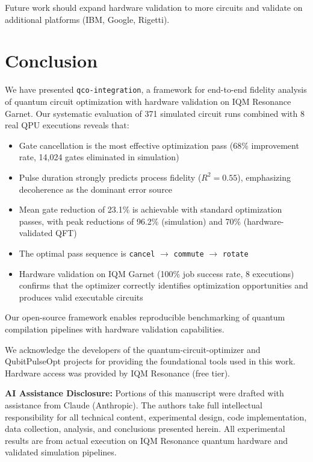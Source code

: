 \documentclass[twocolumn,showpacs,preprintnumbers,amsmath,amssymb,prb]{revtex4-2}
\begin{document}
Future work should expand hardware validation to more circuits and validate on additional platforms (IBM, Google, Rigetti).

\section{Conclusion}
\label{sec:conclusion}

We have presented \texttt{qco-integration}, a framework for end-to-end fidelity analysis of quantum circuit optimization with hardware validation on IQM Resonance Garnet. Our systematic evaluation of 371 simulated circuit runs combined with 8 real QPU executions reveals that:

\begin{itemize}
    \item Gate cancellation is the most effective optimization pass (68\% improvement rate, 14,024 gates eliminated in simulation)
    \item Pulse duration strongly predicts process fidelity ($R^2 = 0.55$), emphasizing decoherence as the dominant error source
    \item Mean gate reduction of 23.1\% is achievable with standard optimization passes, with peak reductions of 96.2\% (simulation) and 70\% (hardware-validated QFT)
    \item The optimal pass sequence is \texttt{cancel} $\rightarrow$ \texttt{commute} $\rightarrow$ \texttt{rotate}
    \item Hardware validation on IQM Garnet (100\% job success rate, 8 executions) confirms that the optimizer correctly identifies optimization opportunities and produces valid executable circuits
\end{itemize}

Our open-source framework enables reproducible benchmarking of quantum compilation pipelines with hardware validation capabilities.

\begin{acknowledgments}
We acknowledge the developers of the quantum-circuit-optimizer and QubitPulseOpt projects for providing the foundational tools used in this work. Hardware access was provided by IQM Resonance (free tier).

\textbf{AI Assistance Disclosure:} Portions of this manuscript were drafted with assistance from Claude (Anthropic). The authors take full intellectual responsibility for all technical content, experimental design, code implementation, data collection, analysis, and conclusions presented herein. All experimental results are from actual execution on IQM Resonance quantum hardware and validated simulation pipelines.
\end{acknowledgments}


\end{document}
